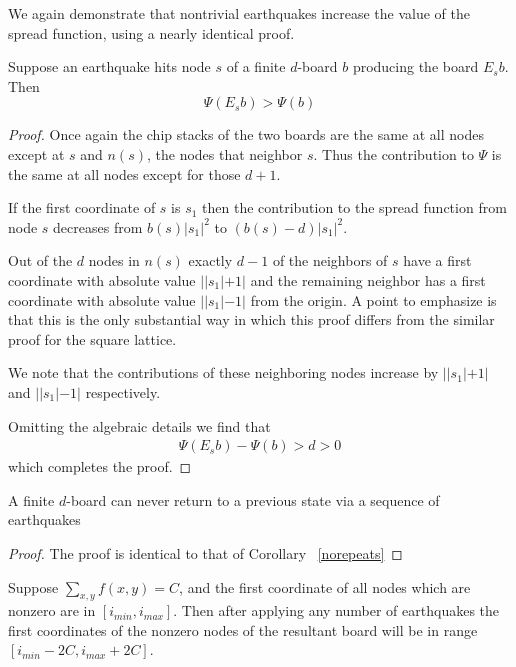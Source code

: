 \documentclass[runningheads,a4paper]{llncs}
\begin{document}
We again demonstrate that nontrivial earthquakes increase the value of the spread function, using a nearly identical proof.
\begin{lemma} 
Suppose an earthquake hits node $s$ of a finite $d$-board $b$ producing the board $E_s b$. Then
\begin{equation*}
\Psi( E_s b) > \Psi (b)
\end{equation*}
\end{lemma}
\begin{proof}
Once again the chip stacks of the two boards are the same at all nodes except at $s$ and $n(s)$, the nodes that neighbor $s$. Thus the contribution to $\Psi$ is the same at all nodes except for those $d+1$.

If the first coordinate of $s$ is $s_1$ then the contribution to the spread function from node $s$ decreases from $b(s)|s_1|^2$ to $(b(s)-d)|s_1|^2$. 

Out of the $d$ nodes in $n(s)$ exactly $d-1$ of the neighbors of $s$ have a first coordinate with absolute value $||s_1| +1|$ and the remaining neighbor has a first coordinate with absolute value $||s_1| - 1|$ from the origin.  A point to emphasize is that this is the only substantial way in which this proof differs from the similar proof for the square lattice. 

We note that the contributions of these neighboring nodes increase by $||s_1| +1|$ and $||s_1|-1|$ respectively. 

Omitting the algebraic details we find that 
\begin{align*}
\Psi( E_s b) - \Psi(b) > d >0
\end{align*}
which completes the proof.
\end{proof}


\begin{corollary}
\label{notreerepeats}
A finite $d$-board can never return to a previous state via a sequence of earthquakes
\end{corollary}
\begin{proof}
The proof is identical to that of Corollary ~\ref{norepeats}
\end{proof}

\begin{lemma}
\label{finiteextensiontree}
Suppose $\sum_{x,y} f(x,y) = C$, and the first coordinate of all nodes which are nonzero are in $[i_{min}, i_{max}]$. Then after applying any number of earthquakes the first coordinates of the nonzero nodes of the resultant board will be in range $[i_{min} - 2C, i_{max} + 2C]$.
\end{lemma}
\end{document}
